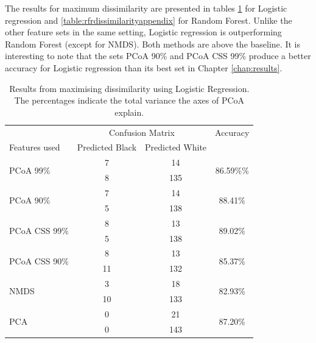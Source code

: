 The results for maximum dissimilarity are presented in tables \ref{table:lrdissimilarityappendix} for Logistic regression and \ref{table:rfrdissimilarityappendix} for Random Forest. Unlike the other feature sets in the same setting, Logistic regression is outperforming Random Forest (except for NMDS). Both methods are above the baseline. It is interesting to note that the sets PCoA 90\% and PCoA CSS 99\% produce a better accuracy for Logistic regression than its best set in Chapter \ref{chap:results}. 
\begin{table}[h]
	\centering
	\begin{tabular}{l c  c c}
		\toprule
		&\multicolumn{2}{c}{Confusion Matrix} & Accuracy\\
		Features used & Predicted Black&Predicted White&\\
		\midrule
		\multirow{2}{*}{PCoA 99\%} &7 &14&\multirow{2}{*}{86.59\%\%}\\
		&	 8&135&\\
		\cmidrule{2-3}
		\multirow{2}{*}{PCoA 90\%} &7 &14&\multirow{2}{*}{88.41\%}\\
		&	 5&138&\\
		\cmidrule{2-3}
		\multirow{2}{*}{PCoA CSS 99\%} &8 &13&\multirow{2}{*}{89.02\%}\\
		&	 5&138&\\
		\cmidrule{2-3}
		\multirow{2}{*}{PCoA CSS 90\%} &8 &13&\multirow{2}{*}{85.37\%}\\
		&	11&132&\\
		\cmidrule{2-3}
		\multirow{2}{*}{NMDS}&3 &18&\multirow{2}{*}{82.93\%}\\
		&	 10&133&\\
						\cmidrule{2-3}
		\multirow{2}{*}{PCA}&0 &21&\multirow{2}{*}{87.20\%}\\
		&	 0&143&\\
		\bottomrule
	\end{tabular}
	\caption{Results from maximising dissimilarity using Logistic Regression. The percentages indicate the total variance the axes of PCoA explain.}
	\label{table:lrdissimilarityappendix}
\end{table}

